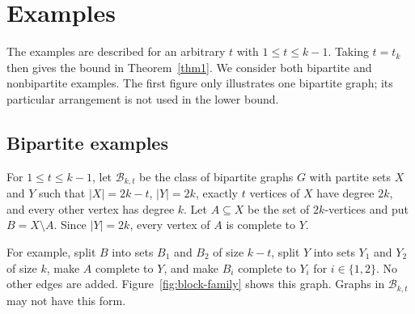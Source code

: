 \documentclass[11pt]{article}
\begin{document}
\section{Examples}\label{sec:examples}

The examples are described for an arbitrary $t$ with
$1\leq t\leq k-1$. Taking $t=t_k$ then gives the bound in
Theorem~\ref{thm1}. We consider both bipartite and nonbipartite
examples. The first figure only illustrates one bipartite graph; its
particular arrangement is not used in the lower bound.

\subsection{Bipartite examples}

For $1\leq t\leq k-1$, let $\mathcal B_{k,t}$ be the class of bipartite
graphs $G$ with partite sets $X$ and $Y$ such that $|X|=2k-t$,
$|Y|=2k$, exactly $t$ vertices of $X$ have degree $2k$, and every other
vertex has degree $k$. Let $A\subseteq X$ be the set of $2k$-vertices
and put $B=X\setminus A$. Since $|Y|=2k$, every vertex of $A$ is
complete to $Y$.

For example, split $B$ into sets $B_1$ and $B_2$ of size $k-t$, split
$Y$ into sets $Y_1$ and $Y_2$ of size $k$, make $A$ complete to $Y$,
and make $B_i$ complete to $Y_i$ for $i\in\{1,2\}$. No other edges are
added. Figure~\ref{fig:block-family} shows this graph. Graphs in
$\mathcal B_{k,t}$ may not have this form.
\end{document}
